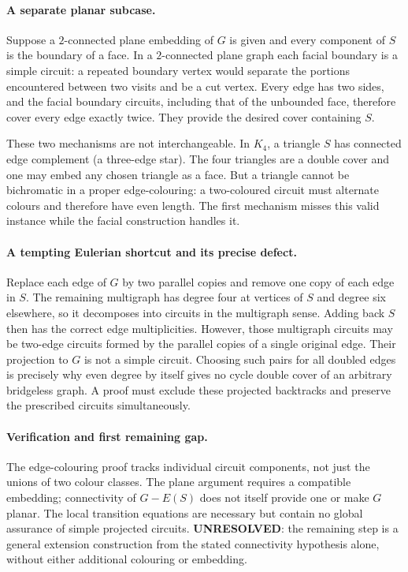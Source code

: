 \documentclass[11pt,a4paper]{article}
\begin{document}
\paragraph{A separate planar subcase.}
Suppose a $2$-connected plane embedding of $G$ is given and every
component of $S$ is the boundary of a face. In a $2$-connected
plane graph each facial boundary is a simple circuit: a repeated
boundary vertex would separate the portions encountered between
two visits and be a cut vertex. Every edge has two sides, and
the facial boundary circuits, including that of the unbounded
face, therefore cover every edge exactly twice. They provide
the desired cover containing $S$.

These two mechanisms are not interchangeable. In $K_4$, a triangle
$S$ has connected edge complement (a three-edge star). The four
triangles are a double cover and one may embed any chosen triangle
as a face. But a triangle cannot be bichromatic in a proper
edge-colouring: a two-coloured circuit must alternate colours and
therefore have even length. The first mechanism misses this valid
instance while the facial construction handles it.

\paragraph{A tempting Eulerian shortcut and its precise defect.}
Replace each edge of $G$ by two parallel copies and remove one
copy of each edge in $S$. The remaining multigraph has degree four
at vertices of $S$ and degree six elsewhere, so it decomposes
into circuits in the multigraph sense. Adding back $S$ then has
the correct edge multiplicities. However, those multigraph circuits
may be two-edge circuits formed by the parallel copies of a
single original edge. Their projection to $G$ is not a simple
circuit. Choosing such pairs for all doubled edges is precisely
why even degree by itself gives no cycle double cover of an
arbitrary bridgeless graph. A proof must exclude these projected
backtracks and preserve the prescribed circuits simultaneously.

\paragraph{Verification and first remaining gap.}
The edge-colouring proof tracks individual circuit components,
not just the unions of two colour classes. The plane argument
requires a compatible embedding; connectivity of $G-E(S)$ does
not itself provide one or make $G$ planar. The local transition
equations are necessary but contain no global assurance of simple
projected circuits. \textbf{UNRESOLVED}: the remaining step is a
general extension construction from the stated connectivity
hypothesis alone, without either additional colouring or embedding.
\end{document}
